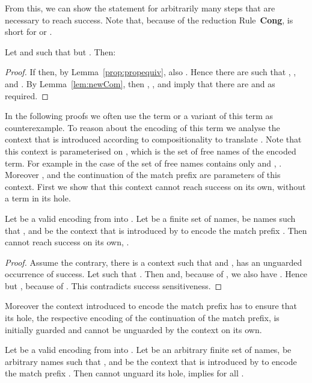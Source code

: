 \documentclass[]{article}
\begin{document}
From this, we can show the statement for arbitrarily many steps that are
necessary to reach success. Note that, because of the reduction
Rule~\textbf{Cong},  is short for  or .

\begin{lemma}
	\label{prop:newCom}
	Let  and  such that  but .
	Then:
	
\end{lemma}

\begin{proof}
	If  then, by Lemma~\ref{prop:propequiv}, also . Hence there are  such that , , and . By Lemma~\ref{lem:newCom}, then , , and  imply that there are  and  as required.
\end{proof}

In the following proofs we often use the term  or a variant of this term as counterexample. To reason about the encoding of this term we analyse the context  that is introduced according to compositionality to translate . Note that this context is parameterised on , which is the set of free names of the encoded term. For example in the case of  the set of free names contains only  and , \ie . Moreover ,  and the continuation of the match prefix are parameters of this context. First we show that this context cannot reach success on its own, \ie without a term in its hole.

\begin{lemma}
	\label{lem:contextCannotReachSuccess}
	Let \encod be a valid encoding from \piT into \piNM.
	Let  be a finite set of names,
	 be names such that ,
	and  be the context that is introduced by  to encode the match prefix . Then  cannot reach success on its own, \ie .
\end{lemma}

\begin{proof}
	Assume the contrary, \ie there is a context  such that  and , \ie  has an unguarded occurrence of success. Let  such that . Then  and, because of , we also have . Hence  but , because of . This contradicts success sensitiveness.
\end{proof}

Moreover the context introduced to encode the match prefix has to ensure that its hole, \ie the respective encoding of the continuation of the match prefix, is initially guarded and cannot be unguarded by the context on its own.

\begin{lemma}
	\label{lem:contextNotUnguardContinuation}
	Let \encod be a valid encoding from \piT into \piNM.
	Let  be an arbitrary finite set of names,
	 be arbitrary names such that ,
	and  be the context that is introduced by  to encode the match prefix . Then  cannot unguard its hole, \ie  implies  for all .
\end{lemma}
\end{document}
